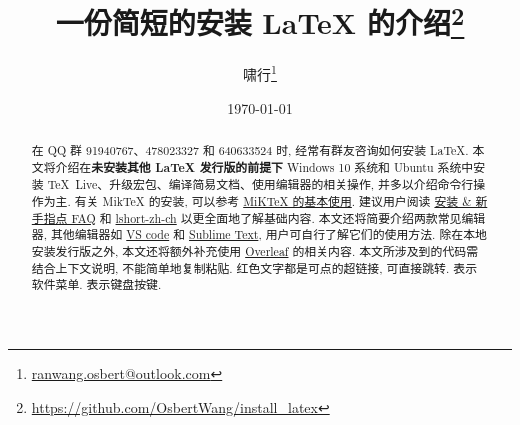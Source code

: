 \documentclass[fontset=fandol]{ctexrep}
\title{\bfseries 一份简短的安装 \LaTeX{} 的介绍\thanks{\url{https://github.com/OsbertWang/install_latex}}}
\author{啸行\thanks{\url{ranwang.osbert@outlook.com}}}
\date{\today}
\begin{document}
  
\maketitle

\begin{abstract}
在 QQ 群 91940767、478023327 和 640633524 时, 经常有群友咨询如何安装 \LaTeX.
本文将介绍在\textbf{未安装其他 \LaTeX{} 发行版的前提下} Windows 10 系统和 Ubuntu 系统中安装 \TeX{}~Live、升级宏包、编译简易文档、使用编辑器的相关操作, 并多以介绍命令行操作为主.
有关 Mik\TeX{} 的安装, 可以参考 \href{https://camuseblog.top/2019-03-02-/MiKTeX/}{MiK\TeX{} 的基本使用}.
建议用户阅读 \href{http://www.latexstudio.net/archives/11469.html}{\LaTeXe{} 安装 \& 新手指点 FAQ} 和 \href{http://mirrors.ctan.org/info/lshort/chinese/lshort-zh-cn.pdf}{lshort-zh-ch} 以更全面地了解基础内容.
本文还将简要介绍两款常见编辑器, 其他编辑器如 \href{https://github.com/EthanDeng/vscode-latex}{VS code} 和 \href{https://github.com/EthanDeng/sublime-text-latex}{Sublime Text}, 用户可自行了解它们的使用方法.
除在本地安装发行版之外,
本文还将额外补充使用 \href{http://www.overleaf.com}{Overleaf} 的相关内容.
本文所涉及到的代码需结合上下文说明, 不能简单地复制粘贴.
红色文字都是可点的超链接, 可直接跳转.
 表示软件菜单.
 表示键盘按键.
\end{abstract}

\tableofcontents






\end{document}
